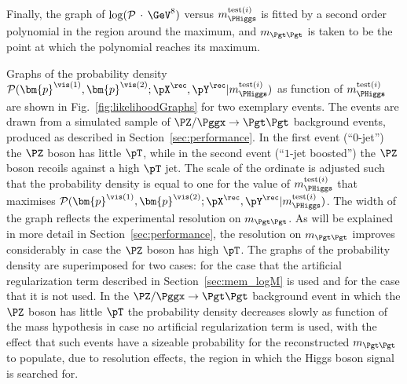 Finally, the graph of $\log(\mathcal{P} \, \cdot \, \mbox{\GeV}^{8})$ 
versus $m_{\PHiggs}^{\textrm{test}(i)}$ is fitted by a second order polynomial
in the region around the maximum,
and $m_{\Pgt\Pgt}$ is taken to be the point at which the polynomial reaches its maximum.

Graphs of the probability density $\mathcal{P}(\bm{p}^{\vis(1)},\bm{p}^{\vis(2)};\pX^{\rec},\pY^{\rec}|m_{\PHiggs}^{\textrm{test}(i)})$ 
as function of $m_{\PHiggs}^{\textrm{test}(i)}$ are shown in Fig.~\ref{fig:likelihoodGraphs} for two exemplary events.
The events are drawn from a simulated sample of $\PZ/\Pggx \to \Pgt\Pgt$ background events, produced as described in Section~\ref{sec:performance}.
In the first event (``$0$-jet'') the $\PZ$ boson has little $\pT$, while in the second event (``$1$-jet boosted'') the $\PZ$ boson recoils against a high $\pT$ jet.
The scale of the ordinate is adjusted such that the probability density is equal to one
for the value of $m_{\PHiggs}^{\textrm{test}(i)}$ that maximises $\mathcal{P}(\bm{p}^{\vis(1)},\bm{p}^{\vis(2)};\pX^{\rec},\pY^{\rec}|m_{\PHiggs}^{\textrm{test}(i)})$.
The width of the graph reflects the experimental resolution on $m_{\Pgt\Pgt}$.
As will be explained in more detail in Section~\ref{sec:performance}, the resolution on $m_{\Pgt\Pgt}$ improves considerably in case the $\PZ$ boson has high $\pT$.
The graphs of the probability density are superimposed for two cases:
for the case that the artificial regularization term described in Section~\ref{sec:mem_logM} is used and for the case that it is not used.
In the $\PZ/\Pggx \to \Pgt\Pgt$ background event in which the $\PZ$ boson has little $\pT$
the probability density decreases slowly as function of the mass hypothesis in case no artificial regularization term is used,
with the effect that such events have a sizeable probability for the reconstructed $m_{\Pgt\Pgt}$ to populate, due to resolution effects, 
the region in which the Higgs boson signal is searched for.
